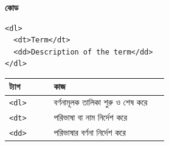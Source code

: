 \par\noindent
\begin{minipage}[t]{.50\linewidth}\vspace{0pt}\small
\textbf{\color{chFourTeal}কোড}\par
\begin{verbatim}
<dl>
  <dt>Term</dt>
  <dd>Description of the term</dd>
</dl>
\end{verbatim}

\par\smallskip
\end{minipage}\hfill
\begin{minipage}[t]{.46\linewidth}\vspace{0pt}\small
\begin{tabular}{|p{0.25\linewidth}|p{0.64\linewidth}|}
\hline
\textbf{ট্যাগ} & \textbf{কাজ} \\
\hline
\texttt{<dl>} & বর্ণনামূলক তালিকা শুরু ও শেষ করে \\
\hline
\texttt{<dt>} & পরিভাষা বা নাম নির্দেশ করে \\
\hline
\texttt{<dd>} & পরিভাষার বর্ণনা নির্দেশ করে \\
\hline
\end{tabular}
\end{minipage}\par


